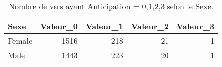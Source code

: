 \begin{table}[H]

\caption{Nombre de vers ayant Anticipation = 0,1,2,3 selon le Sexe.}
\centering
\begin{tabular}[t]{lrrrr}
\toprule
Sexe & Valeur\_0 & Valeur\_1 & Valeur\_2 & Valeur\_3\\
\midrule
Female & 1516 & 218 & 21 & 1\\
Male & 1443 & 223 & 20 & 1\\
\bottomrule
\end{tabular}
\end{table}